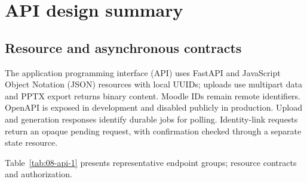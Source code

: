 \clearpage\section{API design summary}\label{sec:api}
\subsection{Resource and asynchronous contracts}
The application programming interface (API) uses FastAPI and JavaScript Object Notation (JSON) resources with local UUIDs; uploads use multipart data and PPTX export returns binary content. Moodle IDs remain remote identifiers. OpenAPI is exposed in development and disabled publicly in production. Upload and generation responses identify durable jobs for polling. Identity-link requests return an opaque pending request, with confirmation checked through a separate state resource.
\par
Table~\ref{tab:08-api-1} presents representative endpoint groups; resource contracts and authorization.
